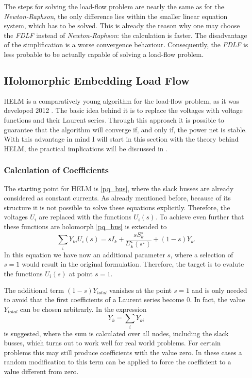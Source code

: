 The steps for solving the load-flow problem are nearly the same as for the \emph{Newton-Raphson}, the only difference lies within the smaller linear equation system, which has to be solved. This is already the reason why one may choose the \emph{FDLF} instead of \emph{Newton-Raphson}: the calculation is faster. The disadvantage of the simplification is a worse convergence behaviour. Consequently, the \emph{FDLF} is less probable to be actually capable of solving a load-flow problem.

\subsection{Holomorphic Embedding Load Flow}
\label{sec:helm}

HELM is a comparatively young algorithm for the load-flow problem, as it was developed 2012 \citep{helmIEEE}. The basic idea behind it is to replace the voltages with voltage functions and their Laurent series. Through this approach it is possible to guarantee that the algorithm will converge if, and only if, the power net is stable. With this advantage in mind I will start in this section with the theory behind HELM, the practical implications will be discussed in .

\subsubsection{Calculation of Coefficients}

The starting point for HELM is \eqref{pq_bus}, where the slack busses are already considered as constant currents. As already mentioned before, because of its structure it is not possible to solve these equations explicitly. Therefore, the voltages $U_i$ are replaced with the functions $U_i(s)$. To achieve even further that these functions are holomorph \citep{helmPatentSept2009} \eqref{pq_bus} is extended to
\begin{equation}	
		\sum_i Y_{ki} U_{i}(s) = s I_k + \frac{s S_k^\star}{U_k^\star(s^\star)} + (1 - s) Y_k.
		\label{eq:pq_bus_embedded}
\end{equation}
In this equation we have now an additional parameter $s$, where a selection of $s = 1$ would result in the original formulation. Therefore, the target is to evalute the functions $U_i(s)$ at point $s = 1$.

The additional term $(1 - s) Y_{total}$ vanishes at the point $s = 1$ and is only needed to avoid that the first coefficients of a Laurent series become 0. In fact, the value $Y_{total}$ can be chosen arbitrarly. In \citep{helmPatentSept2009} the expression
\begin{equation}
	Y_k = \sum_i Y_{ki}
\end{equation}
is suggested, where the sum is calculated over all nodes, including the slack busses, which turns out to work well for real world problems. For certain problems this may still produce coefficients with the value zero. In these cases a random modification to this term can be applied to force the coefficient to a value different from zero.

